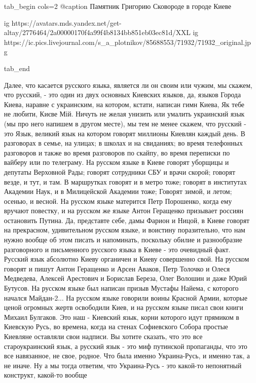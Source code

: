 \ifcmt
tab_begin cols=2
  @caption Памятник Григорию Сковороде в городе Киеве

  ig https://avatars.mds.yandex.net/get-altay/2776464/2a00000170f4a99f4b8134bb851eb03ec81d/XXL
	ig https://ic.pics.livejournal.com/s_a_plotnikov/85688553/71932/71932_original.jpg

tab_end
\fi

Далее, что касается русского языка, является ли он своим или чужим, мы скажем,
что русский, - это один из двух основных Киевских языков, да, языков Города
Киева, наравне с украинским, на котором, кстати, написан гимн Киева, Як тебе не
любити, Києве Мій. Ничуть не желая унизить или умалить украинский язык (мы про
него напишем в другом месте), мы тем не менее скажем, что русский - это Язык,
великий язык на котором говорят миллионы Киевлян каждый день. В разговорах в
семье, на улицах; в школах и на свиданиях; во время телефонных разговоров и
также во время разговоров по скайпу, во время переписки по вайберу или по
телеграму. На русском языке в Киеве говорят уборщицы и депутаты Верховной Рады;
говорят сотрудники СБУ и врачи скорой; говорят везде, и тут, и там. В
маршрутках говорят и в метро тоже; говорят в институтах Академии Наук, и в
Милицейской Академии тоже; Говорят зимой, и летом; осенью, и весной. На русском
языке матерится Петр Порошенко, когда ему вручают повестку, и на русском же
языке Антон Геращенко призывает россиян остановить Путина. Да, представте себе,
дамы Фарион и Ницой, в Киеве говорят на прекрасном, удивительном русском языке,
и воистину поразительно, что нам нужно вообще об этом писать и напоминать,
поскольку обилие и разнообразие разговорного и письменного русского языка в
Киеве - это очевидный факт.  Русский язык абсолютно Киеву органичен и Киеву
совершенно свой. На русском говорят и пишут Антон Геращенко и Арсен Аваков,
Петр Толочко и Олеся Медведева, Алексей Арестович и Борислав Береза, Олег
Волошин и даже Юрий Бутусов. На русском языке был написан призыв Мустафы Найема, с которого начался Майдан-2... 
На русском языке говорили воины Красной Армии,
которые ценой огромных жертв освободили Киев, и на русском языке писал свои
книги Михаил Булгаков. Это наш - Киевский язык, корни которого идут прямиком в
Киевскую Русь, во времена, когда на стенах Софиевского Собора простые Киевляне
оставляли свои надписи. Вы хотите сказать, что это все староукраинский язык, а
русский язык - это миф путинской пропаганды, что это все навязанное, не свое,
родное. Что была именно Украина-Русь, и именно так, а не иначе.  Ну а мы тогда
ответим, что Украина-Русь - это какой-то непонятный конструкт, какой-то вообще
